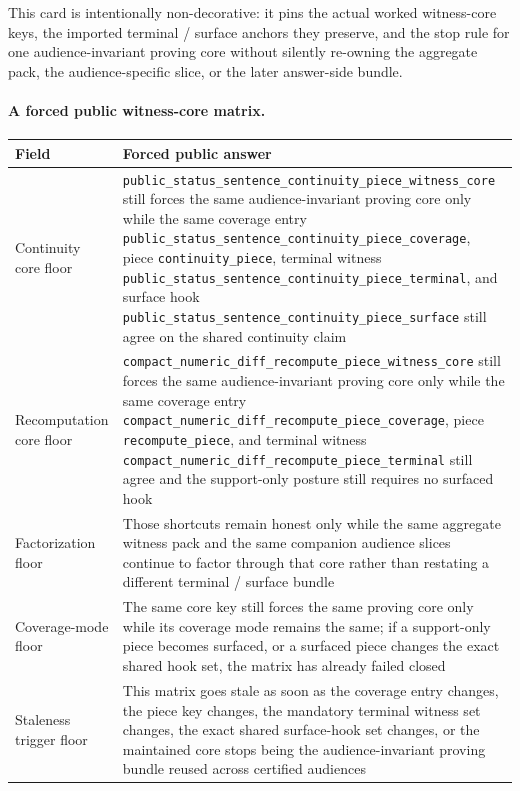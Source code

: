 \documentclass[11pt]{article}
\begin{document}
This card is intentionally non-decorative: it pins the actual worked witness-core keys, the imported terminal / surface anchors they preserve, and the stop rule for one audience-invariant proving core without silently re-owning the aggregate pack, the audience-specific slice, or the later answer-side bundle.\cite{series:workedexample}

\paragraph{A forced public witness-core matrix.}
\begin{table}[t]
\centering
\small
\begin{tabularx}{\linewidth}{@{}lX@{}}
\toprule
Field & Forced public answer \\
\midrule
Continuity core floor & \nolinkurl{public_status_sentence_continuity_piece_witness_core} still forces the same audience-invariant proving core only while the same coverage entry \nolinkurl{public_status_sentence_continuity_piece_coverage}, piece \nolinkurl{continuity_piece}, terminal witness \nolinkurl{public_status_sentence_continuity_piece_terminal}, and surface hook \nolinkurl{public_status_sentence_continuity_piece_surface} still agree on the shared continuity claim \\
Recomputation core floor & \nolinkurl{compact_numeric_diff_recompute_piece_witness_core} still forces the same audience-invariant proving core only while the same coverage entry \nolinkurl{compact_numeric_diff_recompute_piece_coverage}, piece \nolinkurl{recompute_piece}, and terminal witness \nolinkurl{compact_numeric_diff_recompute_piece_terminal} still agree and the support-only posture still requires no surfaced hook \\
Factorization floor & Those shortcuts remain honest only while the same aggregate witness pack and the same companion audience slices continue to factor through that core rather than restating a different terminal / surface bundle \\
Coverage-mode floor & The same core key still forces the same proving core only while its coverage mode remains the same; if a support-only piece becomes surfaced, or a surfaced piece changes the exact shared hook set, the matrix has already failed closed \\
Staleness trigger floor & This matrix goes stale as soon as the coverage entry changes, the piece key changes, the mandatory terminal witness set changes, the exact shared surface-hook set changes, or the maintained core stops being the audience-invariant proving bundle reused across certified audiences \\

\end{tabularx}
\end{table}
\end{document}
